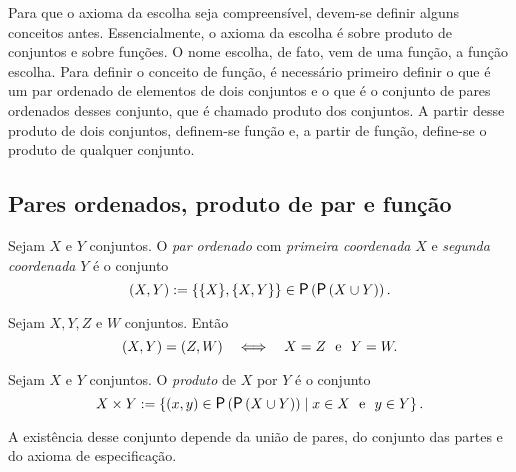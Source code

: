 Para que o axioma da escolha seja compreensível, devem-se definir alguns conceitos antes. Essencialmente, o axioma da escolha é sobre produto de conjuntos e sobre funções. O nome escolha, de fato, vem de uma função, a função escolha. Para definir o conceito de função, é necessário primeiro definir o que é um par ordenado de elementos de dois conjuntos e o que é o conjunto de pares ordenados desses conjunto, que é chamado produto dos conjuntos. A partir desse produto de dois conjuntos, definem-se função e, a partir de função, define-se o produto de qualquer conjunto.

\subsection*{Pares ordenados, produto de par e função}

\begin{definition}
Sejam $X$ e $Y$ conjuntos. O \emph{par ordenado} com \emph{primeira coordenada} $X$ e \emph{segunda coordenada} $Y$ é o conjunto
	\begin{equation*}
	(X,Y) := \{\{X\},\{X,Y\}\} \in \p\left(\p\left(X \cup Y\right)\right).
	\end{equation*}
\end{definition}

\begin{proposition}
Sejam $X,Y,Z$ e $W$ conjuntos. Então
	\begin{equation*}
	(X,Y) = (Z,W) \quad \Longleftrightarrow \quad X=Z \text{\ \ e\ \ } Y=W.
	\end{equation*}
\end{proposition}

\begin{definition}
Sejam $X$ e $Y$ conjuntos. O \emph{produto} de $X$ por $Y$ é o conjunto
	\begin{equation*}
	X \times Y := \set{(x,y) \in \p\left(\p\left(X \cup Y\right)\right)}{x \in X \e y \in Y}.
	\end{equation*}
\end{definition}

A existência desse conjunto depende da união de pares, do conjunto das partes e do axioma de especificação.

%

